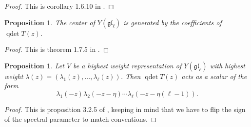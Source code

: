 \documentclass[11pt]{report}
\newtheorem{prop}[theorem]{Proposition}
\theoremstyle{definition}
\theoremstyle{remark}
\theoremstyle{remark}
\newcommand{\id}{\textnormal{id}}
\begin{document}
\begin{proof}
This is corollary 1.6.10 in \cite{book:molev}.
\end{proof}

\begin{prop}
The center of $Y(\mathfrak{gl}_\ell)$ is generated by the coefficients of $\operatorname{qdet} T(z)$.
\end{prop}

\begin{proof}
This is theorem 1.7.5 in \cite{book:molev}.
\end{proof}

\begin{prop}\label{prop:quantumDetWeights}
Let $V$ be a highest weight representation of $Y(\mathfrak{gl}_\ell)$ with highest weight $\lambda(z) = (\lambda_1(z),...,\lambda_\ell(z))$. Then $\operatorname{qdet} T(z)$ acts as a scalar of the form
\begin{equation*}
\lambda_1(-z) \lambda_2(-z-\eta) \cdots \lambda_\ell(-z-\eta(\ell-1)).
\end{equation*}
\end{prop}

\begin{proof}
This is proposition 3.2.5 of \cite{book:molev}, keeping in mind that we have to flip the sign of the spectral parameter to match conventions. %
\end{proof}
\end{document}
